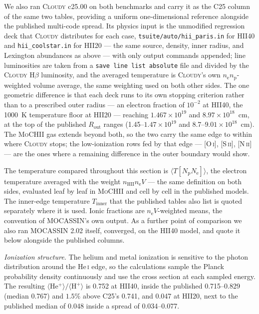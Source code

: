 \documentclass[twocolumn,linenumbers]{aastex702}
\newcommand{\code}[1]{\texttt{#1}}
\newcommand{\MoCHII}{\textsc{MoCHII}}
\newcommand{\HeI}{He\,\textsc{i}}
\newcommand{\nelec}{n_{\mathrm{e}}}
\begin{document}
We also ran \textsc{Cloudy} c25.00 \citep{cloudy2025} on both benchmarks and
carry it as the C25 column of the same two tables, providing a uniform
one-dimensional reference alongside the published multi-code spread.  Its
physics input is the
unmodified regression deck that \textsc{Cloudy} distributes for each case,
\code{tsuite/auto/hii\_paris.in} for HII40 and \code{hii\_coolstar.in} for
HII20 --- the same source, density, inner radius, and Lexington abundances as
above --- with only output commands appended; line luminosities are taken
from a \code{save line list absolute} file and divided by the \textsc{Cloudy}
H$\beta$ luminosity, and the averaged temperature is \textsc{Cloudy}'s own
$n_{\mathrm{e}}n_{\mathrm{p}}$-weighted volume average, the same weighting
used on both other sides.  The one geometric difference is that each deck
runs to its own stopping criterion rather than to a prescribed outer radius
--- an electron fraction of $10^{-2}$ at HII40, the 1000~K temperature floor
at HII20 --- reaching $1.467\times10^{19}$ and $8.97\times10^{18}$~cm, at
the top of the published $R_{\mathrm{out}}$ ranges (1.45--$1.47\times10^{19}$
and 8.7--$9.01\times10^{18}$~cm).  The \MoCHII{} gas extends beyond both, so
the two carry the same edge to within where \textsc{Cloudy} stops; the
low-ionization rows fed by that edge --- [O\,\textsc{i}], [S\,\textsc{ii}],
[N\,\textsc{ii}] --- are the ones where a remaining difference in the outer
boundary would show.

The temperature compared throughout this section is
$\langle T[N_{\mathrm{p}}N_{\mathrm{e}}]\rangle$, the electron temperature
averaged with the weight $n_{\mathrm{HII}}\nelec V$ --- the same definition
on both sides, evaluated leaf by leaf in \MoCHII{} and cell by cell in the
published models.  The inner-edge temperature $T_{\mathrm{inner}}$ that the
published tables also list is quoted separately where it is used.  Ionic
fractions are $\nelec V$-weighted means, the convention of MOCASSIN's own
output.  As a further point of comparison we also ran MOCASSIN 2.02 itself,
converged, on the HII40 model, and quote it below alongside the published
columns.

\emph{Ionization structure.}  The helium and metal ionization is sensitive
to the photon distribution around the \HeI{} edge, so the calculations
sample the Planck probability density continuously and use the cross
section at each sampled energy.  The resulting
$\langle\mathrm{He^{+}}\rangle/\langle\mathrm{H^{+}}\rangle$ is 0.752 at
HII40, inside the published 0.715--0.829 (median 0.767) and $1.5\%$ above
C25's 0.741, and 0.047 at HII20, next to the published median of 0.048
inside a spread of 0.034--0.077.
\end{document}
